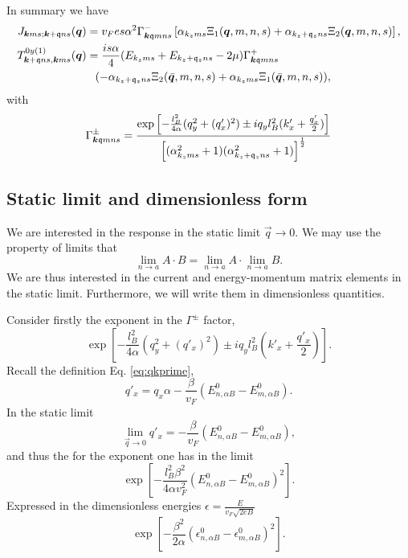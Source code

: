 \begin{summary}
  In summary we have
  \begin{align}
    \label{eq:99}
    J_{\vec{k} m s; \vec{k} + \qvec{q} n s} (\vec{q}) &=
                                                        v_{F} e s \alpha^2
                                                        \Gamma ^-_{\vec{k} \qvec{q} m n s}
                                                        \left[ \alpha_{k_z m s} \Xi_{1} (\vec{q}, m, n, s)
                                                        + \alpha_{k_z + \qvec{q}_z n s} \Xi _{2} (\vec{q}, m, n, s) \right],\\
    T_{\vec{k} + \qvec{q} n s, \vec{k} m s}^{0y (1)} (\vec{q}) &=
                                                                 \frac{is \alpha}{4  }
                                                                 (E_{k_z m s} + E_{k_z + \qvec{q}_z n  s} - 2 \mu) \Gamma ^+_{\vec{k} \qvec{q} m n s} \\
                                                      &\pe (- \alpha_{k_z + \qvec{q}_z n s} \Xi_{2} (\bar{\vec{q}}, m, n, s) + \alpha_{k_z m s} \Xi_{1}(\bar{\vec{q}}, m, n, s)),
  \end{align}
  with
  \[
    \Gamma _{\bm{k} \mathfrak{q} m n s}^{\pm} =
    \frac{
      \exp
      \left[
        - \frac{l_{B}^2}{4 \alpha } (q_{y}^2 + (q' _x)^2) \pm  i q_y l_B^2 (k' _x + \frac{q'_x}{2} )
      \right]
    }{
      \left[(\alpha_{k_z m s}^2 +1) (\alpha_{k_z + \mathfrak{q}_z ns} ^2 + 1)\right]^{\frac{1}{2}}
    }
  \]
\end{summary}
\subsection{Static limit and dimensionless form}
We are interested in the response in the static limit \( \vec{q} \to  0 \).
We may use the property of limits that
\[
  \lim_{n \to a} A \cdot  B = \lim_{n \to a} A \cdot \lim_{n \to a} B.
\]
We are thus interested in the current and energy-momentum matrix elements in the static limit.
Furthermore, we will write them in dimensionless quantities.

Consider firstly the exponent in the \( \Gamma ^{\pm } \) factor,
\[
  \exp
  \left[
    - \frac{l_{B}^2}{4 \alpha } (q_{y}^2 + (q' _x)^2) \pm  i q_y l_B^2 (k' _x + \frac{q'_x}{2} )
  \right].
\]
Recall the definition Eq. \eqref{eq:qkprime},
\begin{equation*}
  q' _x = q_x \alpha  - \frac{\beta}{v_{F} }( E^0_{n,\alpha B} - E^0_{m, \alpha B} ).
\end{equation*}
In the static limit
\[
  \lim_{\vec{q} \to 0} q'_x = - \frac{\beta}{v_{F}}( E^0_{n,\alpha B} - E^0_{m, \alpha B} ),
\]
and thus the for the exponent one has in the limit
\[
  \exp
  \left[
    - \frac{l_{B}^2 \beta ^2}{4 \alpha v_F^2} ( E^0_{n,\alpha B} - E^0_{m, \alpha B} )^2
  \right].
\]
Expressed in the dimensionless energies \( \epsilon = \frac{E}{v_{F} \sqrt{2 e B} } \)
\[
  \exp
  \left[
    - \frac{\beta ^2 }{2 \alpha} ( \epsilon ^0_{n,\alpha B} - \epsilon ^0_{m, \alpha B} )^2
  \right].
\]

